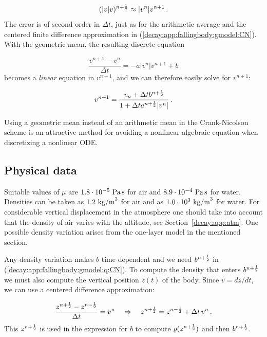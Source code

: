 \documentclass[%
oneside,                 %
final,                   %
10pt]{article}
\begin{document}

\begin{equation}
(|v|v)^{n+\half} \approx |v^n|v^{n+1}
\tp
\end{equation}
The error is of second order in $\Delta t$, just as for the arithmetic
average and the centered finite difference approximation in
(\ref{decay:app:fallingbody:gmodel:CN}). With the geometric mean,
the resulting discrete equation

\[
\frac{v^{n+1}-v^n}{\Delta t} = - a|v^{n}|v^{n+1} + b
\]
becomes a \emph{linear} equation in $v^{n+1}$, and we can
therefore easily solve for $v^{n+1}$:

\begin{equation}
v^{n+1} = \frac{v_n + \Delta t b^{n+\half}}{1 + \Delta t a^{n+\half}|v^{n}|}\tp
\label{decay:app:fallingbody:gmodel:q:CN}
\end{equation}

Using a geometric mean instead of an arithmetic mean in the Crank-Nicolson
scheme is an attractive method for avoiding a nonlinear algebraic
equation when discretizing a nonlinear ODE.


\subsection{Physical data}

Suitable values of $\mu$ are $1.8\cdot 10^{-5}\hbox{ Pa}\, \hbox{s}$ for air
and $8.9\cdot 10^{-4}\hbox{ Pa}\, \hbox{s}$ for water.
Densities can be taken as $1.2\hbox{ kg/m}^3$ for air and as
$1.0\cdot 10^3\hbox{ kg/m}^3$ for water. For considerable vertical
displacement in the atmosphere one should take into account that
the density of air varies with the altitude, see Section~\ref{decay:app:atm}.
One possible density variation arises from the one-layer model
in the mentioned section.

Any density variation makes $b$ time dependent and we need
$b^{n+\half}$ in (\ref{decay:app:fallingbody:gmodel:q:CN}).
To compute the density that enters
$b^{n+\half}$ we must also compute the vertical
position $z(t)$ of the body. Since $v=dz/dt$, we can use a centered
difference approximation:

\[ \frac{z^{n+\half} - z^{n-\half}}{\Delta t} = v^n
\quad\Rightarrow\quad z^{n+\half} = z^{n-\half}+\Delta t\, v^n\tp\]
This $z^{n+\half}$ is used in the expression for $b$
to compute $\varrho(z^{n+\half})$ and then $b^{n+\half}$.
\end{document}
